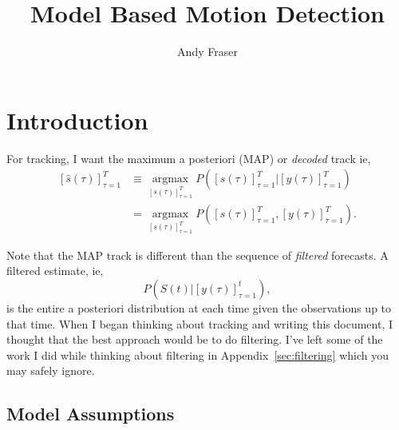 \documentclass[12pt]{article}
\title{Model Based Motion Detection}
\author{Andy Fraser}
\newcommand{\os}[4]{{\left[ #1(#2) \right]}_{#3}^{#4}} %
\newcommand{\ts}[4]{\os{#1}{#2}{#2=#3}{#4}} %
\newcommand{\argmax}{\operatorname*{argmax}}
\begin{document}
\maketitle

\section*{Introduction}
\label{sec:introduction}

For tracking, I want the maximum a posteriori (MAP) or \emph{decoded}
track ie,
\begin{align*}
  \ts{\hat s}{\tau}{1}{T} &\equiv \argmax_{\ts{s}{\tau}{1}{T}}
  P(\ts{s}{\tau}{1}{T}|\ts{y}{\tau}{1}{T}) \\
  &= \argmax_{\ts{s}{\tau}{1}{T}} P(\ts{s}{\tau}{1}{T},\ts{y}{\tau}{1}{T}).
\end{align*}

Note that the MAP track is different than the sequence of
\emph{filtered} forecasts.  A filtered estimate, ie,
\begin{equation*}
  P(S(t)|\ts{y}{\tau}{1}{t}),
\end{equation*}
is the entire a posteriori distribution at each time given the
observations up to that time.  When I began thinking about tracking
and writing this document, I thought that the best approach would be
to do filtering.  I've left some of the work I did while thinking
about filtering in Appendix~\ref{sec:filtering} which you may safely
ignore.

\subsection*{Model Assumptions}
\label{sec:model-assumptions}
\end{document}
